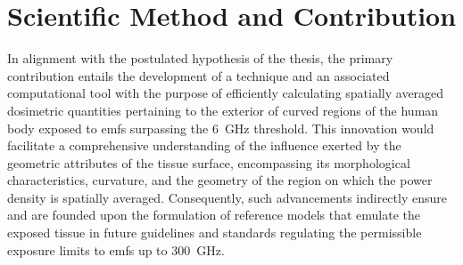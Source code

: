 \section{Scientific Method and Contribution}
\label{sec:scientific_method_and_contribution}
In alignment with the postulated hypothesis of the thesis, the primary contribution entails the development of a technique and an associated computational tool with the purpose of efficiently calculating spatially averaged dosimetric quantities pertaining to the exterior of curved regions of the human body exposed to \gls{emf}s surpassing the \SI{6}{\GHz} threshold.
This innovation would facilitate a comprehensive understanding of the influence exerted by the geometric attributes of the tissue surface, encompassing its morphological characteristics, curvature, and the geometry of the region on which the power density is spatially averaged.
Consequently, such advancements indirectly ensure and are founded upon the formulation of reference models that emulate the exposed tissue in future guidelines and standards regulating the permissible exposure limits to \gls{emf}s up to \SI{300}{\GHz}.

